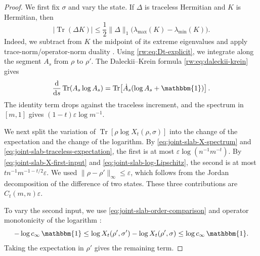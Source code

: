 \documentclass[11pt]{article}
\theoremstyle{remark}
\newcommand{\1}{\mathbbm{1}}
\begin{document}
\begin{proof}
We first fix $\sigma$ and vary the state.  If $\Delta$ is traceless
Hermitian and $K$ is Hermitian, then
\begin{equation}
 |\operatorname{Tr}(\Delta K)|
 \leq\frac12\lVert\Delta\rVert_1
 \bigl(\lambda_{\max}(K)-\lambda_{\min}(K)\bigr).
 \label{eq:joint-slab-traceless-expectation}
\end{equation}
Indeed, we subtract from $K$ the midpoint of its extreme eigenvalues and
apply trace-norm/operator-norm duality
\cite[Eqs.~(1.173)--(1.174)]{watrous2018theory}.  Using
\eqref{rw:eq:Dt-explicit}, we integrate along the segment $A_s$ from
$\rho$ to $\rho'$.  The Daleckii--Krein formula
\eqref{rw:eq:daleckii-krein} gives
\begin{equation}
 \frac{\mathrm d}{\mathrm ds}\operatorname{Tr}(A_s\log A_s)
 =\operatorname{Tr}\!\left[\dot A_s(\log A_s+\1)\right].
\end{equation}
The identity term drops against the traceless increment,
and the spectrum in $[m,1]$ gives
$(1-t)\varepsilon\log m^{-1}$.

We next split the variation of
$\operatorname{Tr}[\rho\log X_t(\rho,\sigma)]$ into the change of
the expectation and the change of the logarithm.  By
\eqref{eq:joint-slab-X-spectrum} and
\eqref{eq:joint-slab-traceless-expectation}, the first is at most
$\varepsilon\log(n^{-1}m^{-t})$.  By
\eqref{eq:joint-slab-X-first-input} and
\eqref{eq:joint-slab-log-Lipschitz}, the second is at most
$tn^{-1}m^{-1-t/2}\varepsilon$.  We used
$\lVert\rho-\rho'\rVert_\infty\leq\varepsilon$, which follows from
the Jordan decomposition of the difference of two states.  These
three contributions are $C_t(m,n)\varepsilon$.

To vary the second input, we use
\eqref{eq:joint-slab-order-comparison} and operator monotonicity of
the logarithm \cite[Section~5.3.7, pp.~158--159]
{bhatia2009positive}:
\begin{equation}
 -\log c_\infty\,\1
 \leq\log X_t(\rho',\sigma')
       -\log X_t(\rho',\sigma)
 \leq\log c_\infty\,\1.
\end{equation}
Taking the expectation in $\rho'$ gives the remaining term.
\end{proof}
\end{document}
